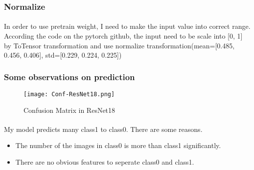 \subsubsection{Normalize}
\paragraph{}
In order to use pretrain weight, I need to make the input value into correct range. According the code on the pytorch github, the input need to be scale into [0, 1] by ToTensor transformation and use normalize transformation(mean=[0.485, 0.456, 0.406], std=[0.229, 0.224, 0.225])
\subsubsection{Some observations on prediction}
\begin{figure}[!ht]
    \begin{center} 
        \texttt{[image: Conf-ResNet18.png]}
        \caption{Confusion Matrix in ResNet18}
    \end{center} 
\end{figure}
\paragraph{}
My model predicts many class1 to class0. There are some reasons.
\begin{itemize}
    \item The number of the images in class0 is more than class1 significantly.
    \item There are no obvious features to seperate class0 and class1.
\end{itemize}
